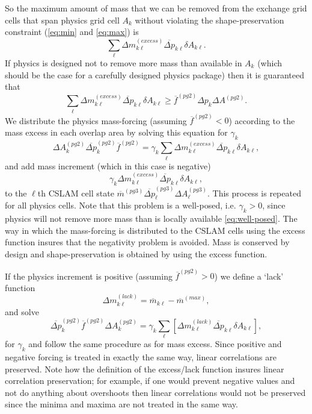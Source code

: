 So the maximum amount of mass that we can be removed from the exchange grid cells that span physics grid cell $A_k$ without violating the shape-preservation constraint (\eqref{eq:min} and \eqref{eq:max}) is
\begin{equation}
\sum_\ell \Delta m^{(excess)}_{k\ell}\overline{\Delta p}_{k\ell} \delta A_{k\ell}.
\end{equation}
If physics is designed not to remove more mass than available in $A_k$ (which should be the case for a carefully designed physics package) then it is guaranteed that
\begin{equation}
\label{eq:well-posed}
\sum_\ell \Delta m^{(excess)}_{k\ell}\overline{\Delta p}_{k\ell} \delta A_{k\ell}\ge {\overline{f}}^{(pg2)}\Delta p_k\Delta A^{(pg2)}.
\end{equation}
We distribute the physics mass-forcing (assuming ${\overline{f}}^{(pg2)}<0$) according to the mass excess in each overlap area by solving this equation for $\gamma_k$
\begin{equation}
\Delta A_k^{(pg2)}\overline{\Delta p}_k^{(pg2)}{\overline{f}}^{(pg2)}=\gamma_k \sum_\ell \Delta m^{(excess)}_{k\ell}\overline{\Delta p}_{k\ell} \delta A_{k\ell},
\end{equation}
and add mass increment (which in this case is negative)
\begin{equation}
\gamma_k \Delta m^{(excess)}_{k\ell}\overline{\Delta p}_{k\ell} \delta A_{k\ell},
\end{equation}
to the $\ell$th CSLAM cell state ${\overline{m}}^{(pg3)} \overline{\Delta p}^{(pg3)}_\ell \Delta A^{(pg3)}_\ell$. This process is repeated for all physics cells. Note that this problem is a well-posed, i.e. $\gamma_k>0$, since physics will not remove more mass than is locally available \eqref{eq:well-posed}. The way in which the mass-forcing is distributed to the CSLAM cells using the excess function insures that the negativity problem is avoided. Mass is conserved by design and shape-preservation is obtained by using the excess function.

If the physics increment is positive (assuming ${\overline{f}}^{(pg2)}>0$) we define a `lack' function
\begin{equation}
\Delta m^{(lack)}_{k\ell}=\overline{m}_{k\ell}-\overline{m}^{(max)},
\end{equation}
and solve
\begin{equation}
\label{eq:mass-fixer}
\overline{\Delta p}_k^{(pg2)}{\overline{f}}^{(pg2)}\Delta A_k^{(pg2)}=\gamma_k \sum_\ell \left[ \Delta m^{(lack)}_{k\ell}\overline{\Delta p}_{k\ell} \delta A_{k\ell}\right],
\end{equation}
for $\gamma_k$ and follow the same procedure as for mass excess. Since positive and negative forcing is treated in exactly the same way, linear correlations are preserved. Note how the definition of the excess/lack function insures linear correlation preservation; for example, if one would prevent negative values and not do anything about overshoots then linear correlations would not be preserved since the minima and maxima are not treated in the same way.

